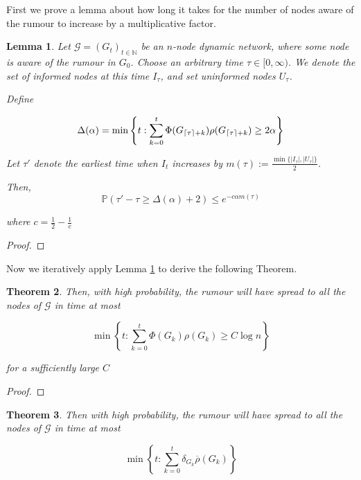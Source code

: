 \documentclass[a4paper,11pt]{article}
\newtheorem{theorem}{Theorem}[section]
\newtheorem{lemma}[theorem]{Lemma}
\theoremstyle{definition}
\newcommand*\comp[1]{\overline{#1}}
\DeclarePairedDelimiter\ceil{\lceil}{\rceil}
\begin{document}
First we prove a lemma about how long it takes for the number of nodes aware of the rumour to increase by a multiplicative factor. 

\begin{lemma} \label{AsyncIncreaseLemma}
	Let $\mathcal{G}=(G_t)_{t \in \mathbb{N}}$ be an $n$-node dynamic network, where some node is aware of the rumour in $G_0$. Choose an arbitrary time $\tau \in [0, \infty)$. We denote the set of informed nodes at this time $I_\tau$, and set uninformed nodes $U_\tau$.

	Define 
	
	$$
	\Delta(\alpha) = \min \left\{t: \sum_{k=0}^t \Phi(G_{\ceil{\tau}+k})\rho(G_{\ceil{\tau}+k}) \geq 2 \alpha \right\}
	$$

	Let $\tau'$ denote the earliest time when $I_t$ increases by $m(\tau) := \frac{\min\{|I_\tau|, |U_\tau|\}}{2}$.

	Then, 
	$$
		\mathbb{P}(\tau' - \tau \geq \Delta(\alpha) + 2) \leq e^{-c\alpha m(\tau)}
	$$

	where $c = \frac{1}{2} - \frac{1}{e}$
\end{lemma}

\begin{proof}
	
\end{proof}

Now we iteratively apply Lemma \ref{AsyncIncreaseLemma} to derive the following Theorem.

\begin{theorem}
	\ModelIntro Then, with high probability, the rumour will have spread to all the nodes of $\mathcal{G}$ in time at most

	$$
		\min \left\{t : \sum_{k=0}^t \Phi(G_k)\rho(G_k) \geq C \log n \right\} 
	$$

	\noindent
	for a sufficiently large $C$
\end{theorem}

\begin{proof}

\end{proof}

\begin{theorem}
	\ModelIntro Then with high probability, the rumour will have spread to all the nodes of $\mathcal{G}$ in time at most 

	$$ 
		\min \left\{ t : \sum_{k=0}^t \delta_{G_k} \comp{\rho}(G_k) \right\}
	$$

\end{theorem}
\end{document}
